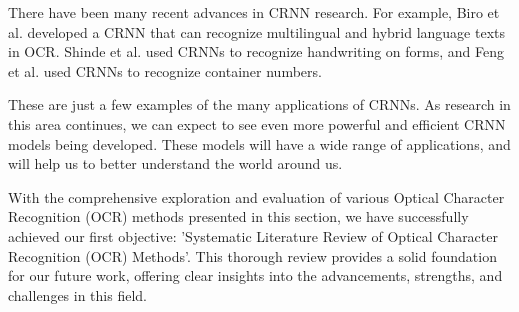There have been many recent advances in CRNN research. For example, Biro et al. developed a CRNN that can recognize multilingual and hybrid language texts in OCR. Shinde et al. used CRNNs to recognize handwriting on forms, and Feng et al. used CRNNs to recognize container numbers.

These are just a few examples of the many applications of CRNNs. As research in this area continues, we can expect to see even more powerful and efficient CRNN models being developed. These models will have a wide range of applications, and will help us to better understand the world around us.

With the comprehensive exploration and evaluation of various Optical Character Recognition (OCR) methods presented in this section, we have successfully achieved our first objective: 'Systematic Literature Review of Optical Character Recognition (OCR) Methods'. This thorough review provides a solid foundation for our future work, offering clear insights into the advancements, strengths, and challenges in this field.